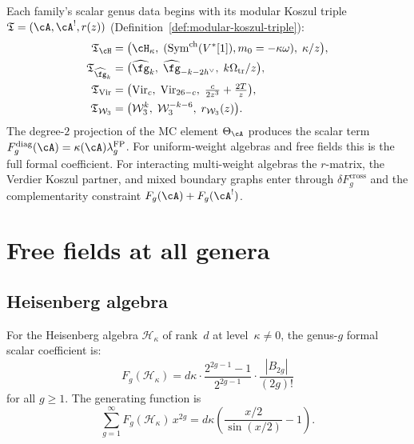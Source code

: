 \noindent
Each family's scalar genus data begins with its modular Koszul triple
$\mathfrak{T} = (\cA, \cA^!, r(z))$
(Definition~\ref{def:modular-koszul-triple}):
\begin{equation}\begin{aligned}
\mathfrak{T}_{\cH}
 &= \bigl(\cH_\kappa,\;
 (\operatorname{Sym}^{\mathrm{ch}}(V^*[1]),m_0=-\kappa\omega),\;
 \kappa/z\bigr), \\
\mathfrak{T}_{\widehat{\fg}_k}
 &= \bigl(\widehat{\fg}_k,\;
 \widehat{\fg}_{-k-2h^\vee},\;
 k\Omega_{\mathrm{tr}}/z\bigr), \\
\mathfrak{T}_{\mathrm{Vir}}
 &= \bigl(\mathrm{Vir}_c,\;
 \mathrm{Vir}_{26-c},\;
 \tfrac{c}{2z^3} + \tfrac{2T}{z}\bigr), \\
\mathfrak{T}_{\mathcal{W}_3}
 &= \bigl(\mathcal{W}_3^k,\;
 \mathcal{W}_3^{-k-6},\;
 r_{\mathcal{W}_3}(z)\bigr).
\end{aligned}
\end{equation}
The degree-$2$ projection of the MC element $\Theta_\cA$ produces
the scalar term
$F_g^{\mathrm{diag}}(\cA)=\kappa(\cA)\lambda_g^{\mathrm{FP}}$.
For uniform-weight algebras and free fields this is the full
formal coefficient. For interacting multi-weight algebras the $r$-matrix,
the Verdier Koszul partner, and mixed boundary graphs enter through
$\delta F_g^{\mathrm{cross}}$ and the complementarity constraint
$F_g(\cA)+F_g(\cA^!)$.

\section{Free fields at all genera}\label{sec:free-field-genera}

\subsection{Heisenberg algebra}
\begin{theorem}\label{thm:heisenberg-all-genera}

For the Heisenberg algebra $\mathcal{H}_\kappa$
of rank~$d$ at level~$\kappa \neq 0$, the genus-$g$
formal scalar coefficient is:
\begin{equation}F_g(\mathcal{H}_\kappa) = d\kappa \cdot
\frac{2^{2g-1}-1}{2^{2g-1}} \cdot
\frac{|B_{2g}|}{(2g)!}
\end{equation}
for all $g \geq 1$. The generating function is
\begin{equation}\sum_{g=1}^{\infty} F_g(\mathcal{H}_\kappa)\, x^{2g}
= d\kappa \left(\frac{x/2}{\sin(x/2)} - 1\right).
\end{equation}
\end{theorem}

